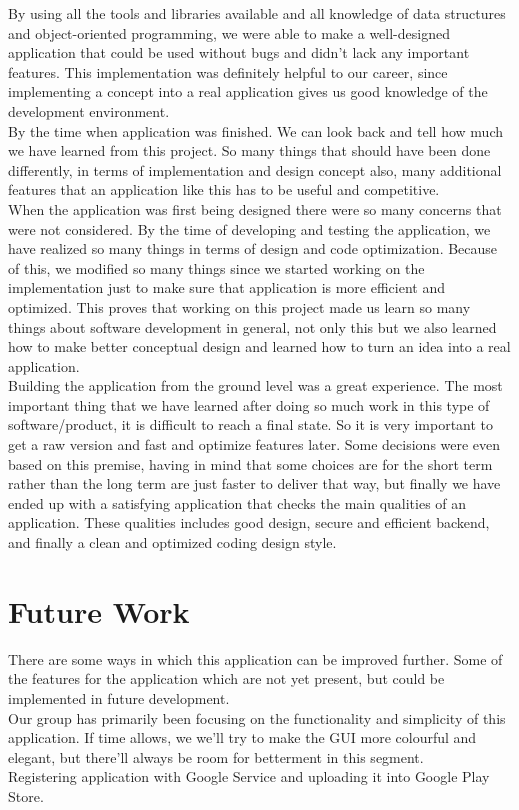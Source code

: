 By using all the tools and libraries available and all knowledge of data structures and object-oriented programming, we were able to make a well-designed application that could be used without bugs and didn’t lack any important features. This implementation was definitely helpful to our career, since implementing a concept into a real application gives us good knowledge of the development environment.\\

By the time when application was finished. We can look back and tell how much we have learned from this project. So many things that should have been done differently, in terms of implementation and design concept also, many additional features that an application like this has to be useful and competitive.\\

When the application was first being designed there were so many concerns that were not considered. By the time of developing and testing the application, we have realized so many things in terms of design and code optimization. Because of this, we modified so many things since we started working on the implementation just to make sure that application is more efficient and optimized. This proves that working on this project made us learn so many things about software development in general, not only this but we also learned how to make better conceptual design and learned how to turn an idea into a real application.\\

Building the application from the ground level was a great experience. The most important thing that we have learned after doing so much work in this type of software/product, it is difficult to reach a final state. So it is very important to get a raw version and fast and optimize features later. Some decisions were even based on this premise, having in mind that some choices are for the short term rather than the long term are just faster to deliver that way, but finally we have ended up with a satisfying application that checks the main qualities of an application. These qualities includes good design, secure and efficient backend, and finally a clean and optimized coding design style.


\section{Future Work}
There are some ways in which this application can be improved further. Some of the features for the application which are not yet present, but could be implemented in future development.\\

Our group has primarily been focusing on the functionality and simplicity of this application. If time allows, we we'll try to make the GUI more colourful and elegant, but there'll always be room for betterment in this segment.\\

Registering application with Google Service and uploading it into Google Play Store.


